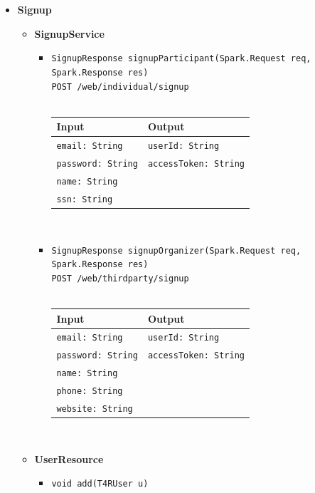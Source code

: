 \documentclass[a4paper, hidelinks, 12pt]{report}
\begin{document}
\begin{itemize}
		\item{\textbf{Signup}}
			\begin{itemize}
				\item{\textbf{SignupService}}
					\begin{itemize}
						\item{\verb|SignupResponse signupParticipant(Spark.Request req, Spark.Response res)|\\ \verb|POST /web/individual/signup|}\\\\
			\begin{tabular}{l | l}
			\textbf{Input} & \textbf{Output} \\
			\hline
				\verb|email: String| & \verb|userId: String| \\
				\verb|password: String| & \verb|accessToken: String| \\
				\verb|name: String| & \\
				\verb|ssn: String| & \\
			\end{tabular}\\
			\item{\verb|SignupResponse signupOrganizer(Spark.Request req, Spark.Response res)|\\ \verb|POST /web/thirdparty/signup|}\\\\
			\begin{tabular}{l | l}
			\textbf{Input} & \textbf{Output} \\
			\hline
				\verb|email: String| & \verb|userId: String| \\
				\verb|password: String| & \verb|accessToken: String| \\
				\verb|name: String| & \\
				\verb|phone: String| & \\
				\verb|website: String| & \\
			\end{tabular}\\
					\end{itemize}
					
				\item{\textbf{UserResource}}
					\begin{itemize}
						\item{\verb|void add(T4RUser u)|}
					\end{itemize}
			\end{itemize}
			

\end{itemize}
\end{document}
